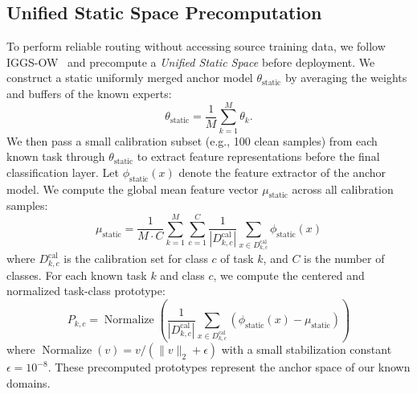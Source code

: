\documentclass{article}
\theoremstyle{plain}
\theoremstyle{definition}
\theoremstyle{remark}
\begin{document}
\subsection{Unified Static Space Precomputation}
To perform reliable routing without accessing source training data, we follow IGGS-OW~\cite{iggs_ow} and precompute a \textit{Unified Static Space} before deployment. We construct a static uniformly merged anchor model $\theta_{\text{static}}$ by averaging the weights and buffers of the known experts:
\begin{equation}
    \theta_{\text{static}} = \frac{1}{M} \sum_{k=1}^M \theta_k.
\end{equation}
We then pass a small calibration subset (e.g., 100 clean samples) from each known task through $\theta_{\text{static}}$ to extract feature representations before the final classification layer. Let $\phi_{\text{static}}(x)$ denote the feature extractor of the anchor model. We compute the global mean feature vector $\mu_{\text{static}}$ across all calibration samples:
\begin{equation}
    \mu_{\text{static}} = \frac{1}{M \cdot C} \sum_{k=1}^M \sum_{c=1}^C \frac{1}{|D_{k, c}^{\text{cal}}|} \sum_{x \in D_{k, c}^{\text{cal}}} \phi_{\text{static}}(x)
\end{equation}
where $D_{k, c}^{\text{cal}}$ is the calibration set for class $c$ of task $k$, and $C$ is the number of classes. For each known task $k$ and class $c$, we compute the centered and normalized task-class prototype:
\begin{equation}
    P_{k, c} = \operatorname{Normalize}\left( \frac{1}{|D_{k, c}^{\text{cal}}|} \sum_{x \in D_{k, c}^{\text{cal}}} (\phi_{\text{static}}(x) - \mu_{\text{static}}) \right)
\end{equation}
where $\operatorname{Normalize}(v) = v / (\|v\|_2 + \epsilon)$ with a small stabilization constant $\epsilon = 10^{-8}$. These precomputed prototypes represent the anchor space of our known domains.
\end{document}
